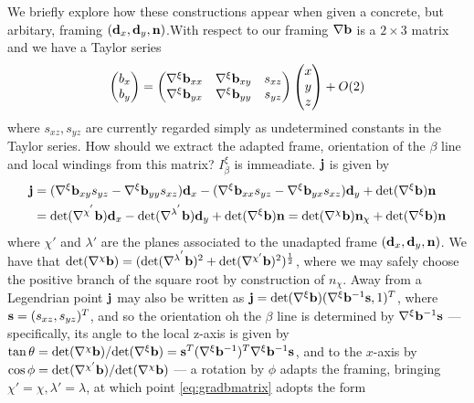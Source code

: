 We briefly explore how these constructions appear when given a concrete, but arbitary, framing $(\mathbf{d}_x,\mathbf{d}_y,\mathbf{n})$.With respect to our framing $\nabla \mathbf{b}$ is a $2\times3$ matrix and we have a Taylor series
\begin{align}
\begin{pmatrix}b_x \\ b_y\end{pmatrix} = 
\begin{pmatrix} 
    \nabla^\xi \mathbf{b}_{xx} & \nabla^\xi \mathbf{b}_{xy} & s_{xz}\\
    \nabla^\xi \mathbf{b}_{yx} & \nabla^\xi \mathbf{b}_{yy} & s_{yz}\\ 
\end{pmatrix}
\begin{pmatrix}x \\ y \\ z \end{pmatrix}  
+ O(2)
\label{eq:gradbmatrix}
\end{align}
where $s_{xz},s_{yz}$ are currently regarded simply as undetermined constants in the Taylor series. How should we extract the adapted frame, orientation of the $\beta$ line and local windings from this matrix? $I_\beta^\xi$ is immeadiate. $\mathbf{j}$ is given by
\begin{align}
    \mathbf{j} &= (\nabla^\xi \mathbf{b}_{xy}s_{yz} - \nabla^\xi \mathbf{b}_{yy}s_{xz})\mathbf{d}_x -( \nabla^\xi \mathbf{b}_{xx}s_{yz} - \nabla^\xi \mathbf{b}_{yx}s_{xz})\mathbf{d}_y + \mathrm{det}(\nabla^\xi \mathbf{b}) \mathbf{n} \\
         &= \mathrm{det}(\nabla^{\chi^{'}} \mathbf{b})\mathbf{d}_x  -\mathrm{det}(\nabla^{\lambda^{'}} \mathbf{b})\mathbf{d}_y + \mathrm{det}(\nabla^\xi \mathbf{b}) \mathbf{n} = \mathrm{det}(\nabla^{\chi}\mathbf{b})\mathbf{n}_\chi + \mathrm{det}(\nabla^\xi \mathbf{b}) \mathbf{n}
\end{align}
where $\chi'$ and $\lambda'$ are the planes associated to the unadapted frame $(\mathbf{d}_x,\mathbf{d}_y, \mathbf{n})$. We have that $\mathrm{det}(\nabla^{\chi} \mathbf{b})= (\mathrm{det}(\nabla^{\lambda^{'}} \mathbf{b})^2 + \mathrm{det}(\nabla^{\chi'}\mathbf{b})^2)^\frac{1}{2}$, where we may safely choose the positive branch of the square root by construction of $n_\chi$. Away from a Legendrian point $\mathbf{j}$ may also be written as $\mathbf{j} = \mathrm{det}(\nabla^\xi \mathbf{b})(\nabla^\xi \mathbf{b}^{-1}\mathbf{s},1)^T$, where $\mathbf{s} = (s_{xz}, s_{yz})^T$, and so the orientation oh the $\beta$ line is determined by $\nabla^\xi \mathbf{b}^{-1} \mathbf{s}$ --- specifically, its angle to the local z-axis is given by $\tan\theta = \mathrm{det}(\nabla^{\chi}\mathbf{b})/ \mathrm{det}(\nabla^{\xi}\mathbf{b})= \mathbf{s}^T (\nabla^\xi \mathbf{b}^{-1})^T \nabla^\xi \mathbf{b}^{-1} \mathbf{s}$, and to the $x$-axis by $\cos \phi =\mathrm{det}(\nabla^{\chi'}\mathbf{b}) /\mathrm{det}(\nabla^{\chi}\mathbf{b})$ --- a rotation by $\phi$ adapts the framing, bringing $\chi'=\chi, \lambda' = \lambda$, at which point \eqref{eq:gradbmatrix} adopts the form

